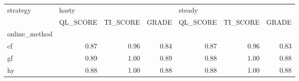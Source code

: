 \begin{tabular}{lrrrrrr}
\toprule
strategy & \multicolumn{3}{l}{hasty} & \multicolumn{3}{l}{steady} \\
{} & QL\_SCORE & TI\_SCORE & GRADE & QL\_SCORE & TI\_SCORE & GRADE \\
online\_method &          &          &       &          &          &       \\
\midrule
cf            &     0.87 &     0.96 &  0.84 &     0.87 &     0.96 &  0.83 \\
gf            &     0.89 &     1.00 &  0.89 &     0.88 &     1.00 &  0.88 \\
hy            &     0.88 &     1.00 &  0.88 &     0.88 &     1.00 &  0.88 \\
\bottomrule
\end{tabular}
